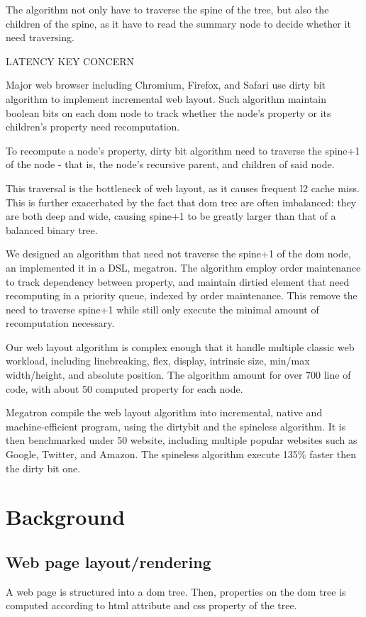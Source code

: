 \documentclass[format=acmsmall, review=false, screen=true]{acmart}
\begin{document}
The algorithm not only have to traverse the spine of the tree, but also the children of the spine, as it have to read the summary node to decide whether it need traversing.


LATENCY KEY CONCERN

Major web browser including Chromium, Firefox, and Safari use dirty bit algorithm to implement incremental web layout. Such algorithm maintain boolean bits on each dom node to track whether the node's property or its children's property need recomputation.

To recompute a node's property, dirty bit algorithm need to traverse the spine+1 of the node - that is, the node's recursive parent, and children of said node. 

This traversal is the bottleneck of web layout, as it causes frequent l2 cache miss. This is further exacerbated by the fact that dom tree are often imbalanced: they are both deep and wide, causing spine+1 to be greatly larger than that of a balanced binary tree.

We designed an algorithm that need not traverse the spine+1 of the dom node, an implemented it in a DSL, megatron. The algorithm employ order maintenance to track dependency between property, and maintain dirtied element that need recomputing in a priority queue, indexed by order maintenance. This remove the need to traverse spine+1 while still only execute the minimal amount of recomputation necessary.

Our web layout algorithm is complex enough that it handle multiple classic web workload, including linebreaking, flex, display, intrinsic size, min/max width/height, and absolute position. The algorithm amount for over 700 line of code, with about 50 computed property for each node.

Megatron compile the web layout algorithm into incremental, native and machine-efficient program, using the dirtybit and the spineless algorithm. It is then benchmarked under 50 website, including multiple popular websites such as Google, Twitter, and Amazon. The spineless algorithm execute 135\% faster then the dirty bit one.
\section{Background}
\subsection{Web page layout/rendering}
A web page is structured into a dom tree. Then, properties on the dom tree is computed according to html attribute and css property of the tree.
\end{document}
